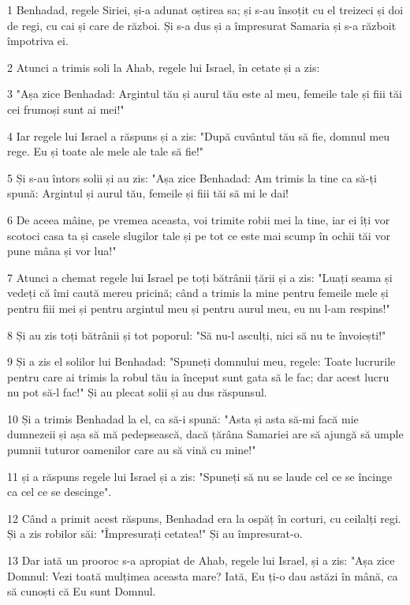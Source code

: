 \par 1 Benhadad, regele Siriei, și-a adunat oștirea sa; și s-au însoțit cu el treizeci și doi de regi, cu cai și care de război. Și s-a dus și a împresurat Samaria și s-a războit împotriva ei.
\par 2 Atunci a trimis soli la Ahab, regele lui Israel, în cetate și a zis:
\par 3 "Așa zice Benhadad: Argintul tău și aurul tău este al meu, femeile tale și fiii tăi cei frumoși sunt ai mei!"
\par 4 Iar regele lui Israel a răspuns și a zis: "După cuvântul tău să fie, domnul meu rege. Eu și toate ale mele ale tale să fie!"
\par 5 Și s-au întors solii și au zis: "Așa zice Benhadad: Am trimis la tine ca să-ți spună: Argintul și aurul tău, femeile și fiii tăi să mi le dai!
\par 6 De aceea mâine, pe vremea aceasta, voi trimite robii mei la tine, iar ei îți vor scotoci casa ta și casele slugilor tale și pe tot ce este mai scump în ochii tăi vor pune mâna și vor lua!"
\par 7 Atunci a chemat regele lui Israel pe toți bătrânii țării și a zis: "Luați seama și vedeți că îmi caută mereu pricină; când a trimis la mine pentru femeile mele și pentru fiii mei și pentru argintul meu și pentru aurul meu, eu nu l-am respins!"
\par 8 Și au zis toți bătrânii și tot poporul: "Să nu-l asculți, nici să nu te învoiești!"
\par 9 Și a zis el solilor lui Benhadad: "Spuneți domnului meu, regele: Toate lucrurile pentru care ai trimis la robul tău ia început sunt gata să le fac; dar acest lucru nu pot să-l fac!" Și au plecat solii și au dus răspunsul.
\par 10 Și a trimis Benhadad la el, ca să-i spună: "Asta și asta să-mi facă mie dumnezeii și așa să mă pedepsească, dacă țărâna Samariei are să ajungă să umple pumnii tuturor oamenilor care au să vină cu mine!"
\par 11 și a răspuns regele lui Israel și a zis: "Spuneți să nu se laude cel ce se încinge ca cel ce se descinge".
\par 12 Când a primit acest răspuns, Benhadad era la ospăț în corturi, cu ceilalți regi. Și a zis robilor săi: "Împresurați cetatea!" Și au împresurat-o.
\par 13 Dar iată un prooroc s-a apropiat de Ahab, regele lui Israel, și a zis: "Așa zice Domnul: Vezi toată mulțimea aceasta mare? Iată, Eu ți-o dau astăzi în mână, ca să cunoști că Eu sunt Domnul.
